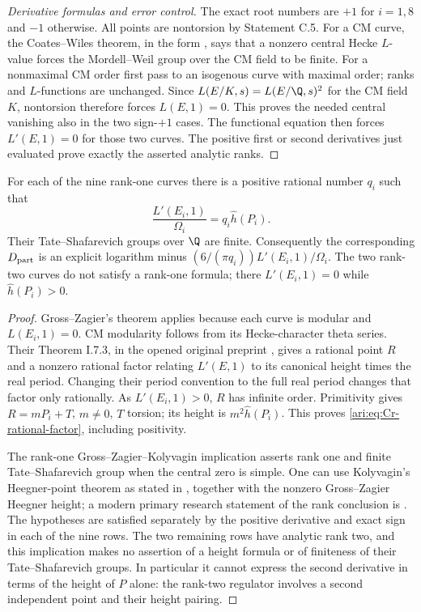 \begin{proof}[Derivative formulas and error control]
The exact root numbers are $+1$ for $i=1,8$ and $-1$ otherwise.
All points are nontorsion by Statement C.5. For a CM curve,
the Coates--Wiles theorem, in the form
\citet[Theorem 10.1]{CrRubin1999}, says that a nonzero central
Hecke $L$-value forces the Mordell--Weil group over the CM field
to be finite. For a nonmaximal CM order first pass to an isogenous
curve with maximal order; ranks and $L$-functions are unchanged.
Since $L(E/K,s)=L(E/\Q,s)^2$ for the CM field $K$, nontorsion
therefore forces $L(E,1)=0$. This proves the needed central
vanishing also in the two sign-$+1$ cases. The functional equation
then forces $L'(E,1)=0$ for those two curves. The positive first
or second derivatives just evaluated prove exactly the asserted
analytic ranks.
\end{proof}

\begin{proposition}\label{ari:C.6.R3}
For each of the nine rank-one curves there is a positive rational
number $q_i$ such that
\begin{equation}\label{ari:eq:Cr-rational-factor}
 \frac{L'(E_i,1)}{\Omega_i}=q_i\widehat h(P_i).
\end{equation}
Their Tate--Shafarevich groups over $\Q$ are finite. Consequently
the corresponding $D_{\rm part}$ is an explicit logarithm minus
$(6/(\pi q_i))L'(E_i,1)/\Omega_i$. The two rank-two curves do
not satisfy a rank-one formula; there $L'(E_i,1)=0$ while
$\widehat h(P_i)>0$.
\end{proposition}
\begin{proof}
Gross--Zagier's theorem applies because each curve is modular and
$L(E_i,1)=0$. CM modularity follows from its Hecke-character
theta series. Their Theorem I.7.3, in the opened original
preprint \citep{CrGrossZagier1986}, gives a rational point $R$ and
a nonzero rational factor relating $L'(E,1)$ to its canonical
height times the real period. Changing their period convention
to the full real period changes that factor only rationally.
As $L'(E_i,1)>0$, $R$ has infinite order. Primitivity gives
$R=mP_i+T$, $m\ne0$, $T$ torsion; its height is
$m^2\widehat h(P_i)$. This proves
\eqref{ari:eq:Cr-rational-factor}, including positivity.

The rank-one Gross--Zagier--Kolyvagin implication asserts rank one
and finite Tate--Shafarevich group when the central zero is simple.
One can use Kolyvagin's Heegner-point theorem as stated in
\citet[Theorem 1.3]{CrGross1991}, together with the nonzero
Gross--Zagier Heegner height; a modern primary research statement
of the rank conclusion is \citet[Theorem 1.1]{CrJetchev2008}.
The hypotheses are satisfied separately by the positive derivative
and exact sign in each of the nine rows. The two remaining rows
have analytic rank two, and this implication makes no assertion
of a height formula or of finiteness of their Tate--Shafarevich
groups. In particular it cannot express the second derivative
in terms of the height of $P$ alone: the rank-two regulator involves
a second independent point and their height pairing.
\end{proof}

